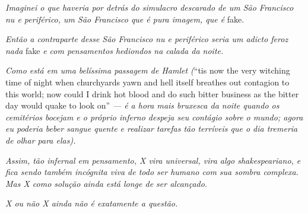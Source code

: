 \emph{Imaginei o que haveria por detrás do simulacro descarado de um São
Francisco nu e periférico, um São Francisco que é pura imagem, que é}
fake.

\emph{Então a contraparte desse São Francisco nu e periférico seria um
adicto feroz nada} fake \emph{e com pensamentos hediondos na calada da noite.}

\emph{Como está em uma belíssima passagem de Hamlet (}``tis now the very
witching time of night when churchyards yawn and hell itself breathes
out contagion to this world; now could I drink hot blood and do such
bitter business as the bitter day would quake to look on'' \emph{--- é a hora mais
bruxesca da noite quando os cemitérios bocejam e o próprio inferno
despeja seu contágio sobre o mundo; agora eu poderia beber sangue quente
e realizar tarefas tão terríveis que o dia tremeria de olhar para elas).}

\emph{Assim, tão infernal em pensamento, X vira universal, vira algo
shakespeariano, e fica sendo também incógnita viva de todo ser humano
com sua sombra complexa. Mas X como solução ainda está longe de ser
alcançado.}

\emph{X ou não X ainda não é exatamente a questão.~}
